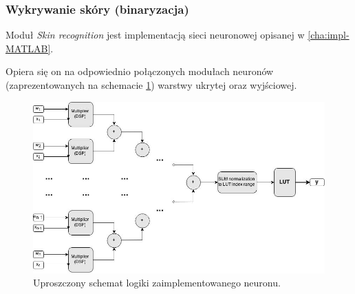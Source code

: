 \subsubsection{Wykrywanie skóry (binaryzacja)} 

Moduł \textit{Skin recognition} jest implementacją sieci neuronowej opisanej w \ref{cha:impl-MATLAB}.

 Opiera się on na odpowiednio połączonych modułach neuronów  (zaprezentowanych na schemacie \ref{fig:neuron}) warstwy ukrytej oraz wyjściowej.

\begin{figure}[tbph!]
	\centering
	\includegraphics[width=1.1\linewidth]{images/wsw-neuron.jpg}
	\caption{Uproszczony schemat logiki zaimplementowanego neuronu.}
	\label{fig:neuron}
\end{figure}


